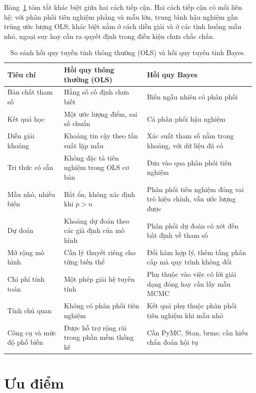 \documentclass[12pt,a4paper]{report}
\begin{document}
Bảng~\ref{tab:compare} tóm tắt khác biệt giữa hai cách tiếp cận. Hai cách tiếp cận có mối liên hệ: với phân phối tiên nghiệm phẳng và mẫu lớn, trung bình hậu nghiệm gần trùng ước
lượng OLS; khác biệt nằm ở cách diễn giải và ở các tình huống mẫu nhỏ, ngoại suy
hay cần ra quyết định trong điều kiện chưa chắc chắn.

\begin{table}[tp]
  \centering
  \small
  \caption{So sánh hồi quy tuyến tính thông thường (OLS) và hồi quy tuyến tính
    Bayes.}
  \label{tab:compare}
  \begin{tabular}{>{\raggedright\arraybackslash}p{3.1cm}
                  >{\raggedright\arraybackslash}p{6.6cm}
                  >{\raggedright\arraybackslash}p{6.9cm}}
    \toprule
    Tiêu chí & Hồi quy thông thường (OLS) & Hồi quy Bayes \\
    \midrule
    Bản chất tham số & Hằng số cố định chưa biết & Biến ngẫu nhiên có phân phối \\
    Kết quả học & Một ước lượng điểm, sai số chuẩn & Cả phân phối hậu nghiệm \\
    Diễn giải khoảng & Khoảng tin cậy theo tần suất lặp mẫu
      & Xác suất tham số nằm trong khoảng, với dữ liệu đã có \\
    Tri thức có sẵn & Không đặc tả tiên nghiệm trong OLS cơ bản & Đưa vào qua phân phối tiên nghiệm \\
    Mẫu nhỏ, nhiều biến & Bất ổn, không xác định khi $p > n$
      & Phân phối tiên nghiệm đóng vai trò hiệu chỉnh, vẫn ước lượng được \\
    Dự đoán & Khoảng dự đoán theo các giả định của mô hình
      & Phân phối dự đoán có xét đến bất định về tham số \\
    Mở rộng mô hình & Cần lý thuyết riêng cho từng biến thể
      & Đổi hàm hợp lý, thêm tầng phân cấp mà quy trình không đổi \\
    Chi phí tính toán & Một phép giải hệ tuyến tính & Phụ thuộc vào việc có lời giải dạng đóng hay cần lấy mẫu MCMC \\
    Tính chủ quan & Không có phân phối tiên nghiệm & Kết quả phụ thuộc phân phối tiên nghiệm khi mẫu nhỏ \\
    Công cụ và mức độ phổ biến & Được hỗ trợ rộng rãi trong phần mềm thống kê
      & Cần PyMC, Stan, brms; cần hiểu chẩn đoán hội tụ \\
    \bottomrule
  \end{tabular}
\end{table}

\section{Ưu điểm}
\end{document}
